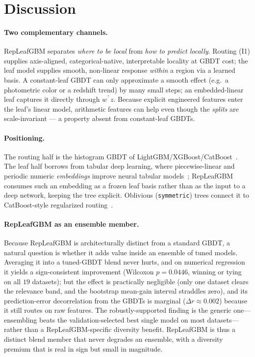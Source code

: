 \documentclass[11pt]{article}
\newcommand{\trans}{^{\top}}
\begin{document}
\section{Discussion}
\label{sec:rationale}

\paragraph{Two complementary channels.}
RepLeafGBM separates \emph{where to be local} from \emph{how to predict locally}.
Routing (I1) supplies axis-aligned, categorical-native, interpretable locality at GBDT
cost; the leaf model supplies smooth, non-linear response \emph{within} a region via a
learned basis. A constant-leaf GBDT can only approximate a smooth effect (e.g.\ a
photometric color or a redshift trend) by many small steps; an embedded-linear leaf
captures it directly through $w^{\!\trans} z$. Because explicit engineered features
enter the leaf's linear model, arithmetic features can help even though the
\emph{splits} are scale-invariant --- a property absent from constant-leaf GBDTs.

\paragraph{Positioning.}
The routing half is the histogram GBDT of
LightGBM/XGBoost/CatBoost~\citep{ke2017lightgbm,chen2016xgboost,prokhorenkova2018catboost}.
The leaf half borrows from tabular deep learning, where piecewise-linear and periodic
numeric \emph{embeddings} improve neural tabular models~\citep{gorishniy2022embeddings};
RepLeafGBM consumes such an embedding as a frozen leaf basis rather than as the input to a
deep network, keeping the tree explicit. Oblivious (\texttt{symmetric}) trees connect it to
CatBoost-style regularized routing~\citep{prokhorenkova2018catboost}.

\paragraph{RepLeafGBM as an ensemble member.}
Because RepLeafGBM is architecturally distinct from a standard GBDT, a natural question is
whether it adds value inside an ensemble of tuned models. Averaging it into a tuned-GBDT
blend never hurts, and on numerical regression it yields a sign-consistent improvement
(Wilcoxon $p=0.0446$, winning or tying on all $19$ datasets); but the effect is practically
negligible (only one dataset clears the relevance band, and the bootstrap mean-gain interval
straddles zero), and its prediction-error decorrelation from the GBDTs is marginal
($\Delta r{\approx}0.002$) because it still routes on raw features. The robustly-supported
finding is the generic one---ensembling beats the validation-selected best single model on
most datasets---rather than a RepLeafGBM-specific diversity benefit. RepLeafGBM is thus a
distinct blend member that never degrades an ensemble, with a diversity premium that is real
in sign but small in magnitude.
\end{document}
